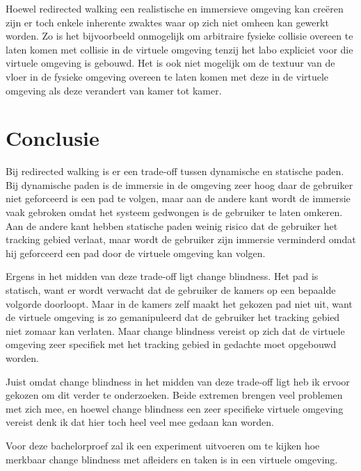 Hoewel redirected walking een realistische en immersieve omgeving kan cre\"eren 
zijn er toch enkele inherente zwaktes waar op zich niet omheen kan gewerkt 
worden. Zo is het bijvoorbeeld onmogelijk om arbitraire fysieke collisie overeen 
te laten komen met collisie in de virtuele omgeving tenzij het labo expliciet 
voor die virtuele omgeving is gebouwd. Het is ook niet mogelijk om de textuur van
de vloer in de fysieke omgeving overeen te laten komen met deze in de virtuele
omgeving als deze verandert van kamer tot kamer.


\section{Conclusie}
Bij redirected walking is er een trade-off tussen dynamische en statische paden.
Bij dynamische paden is de immersie in de omgeving zeer hoog daar de gebruiker
niet geforceerd is een pad te volgen, maar aan de andere kant wordt de immersie
vaak gebroken omdat het systeem gedwongen is de gebruiker te laten omkeren. Aan 
de andere kant hebben statische paden weinig risico dat de gebruiker het
tracking gebied verlaat, maar wordt de gebruiker zijn immersie verminderd omdat
hij geforceerd een pad door de virtuele omgeving kan volgen.

Ergens in het midden van deze trade-off ligt change blindness. Het pad is 
statisch, want er wordt verwacht dat de gebruiker de kamers op een bepaalde
volgorde doorloopt. Maar in de kamers zelf maakt het gekozen pad niet uit, want
de virtuele omgeving is zo gemanipuleerd dat de gebruiker het tracking gebied
niet zomaar kan verlaten. Maar change blindness vereist op zich dat de virtuele
omgeving zeer specifiek met het tracking gebied in gedachte moet opgebouwd 
worden.

Juist omdat change blindness in het midden van deze trade-off ligt heb ik ervoor
gekozen om dit verder te onderzoeken. Beide extremen brengen veel problemen met
zich mee, en hoewel change blindness een zeer specifieke virtuele omgeving
vereist denk ik dat hier toch heel veel mee gedaan kan worden.

Voor deze bachelorproef zal ik een experiment uitvoeren om te kijken hoe 
merkbaar change blindness met afleiders en taken is in een virtuele omgeving.